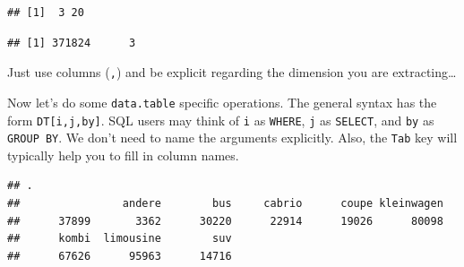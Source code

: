 \documentclass[]{book}
\newenvironment{Shaded}{\begin{snugshade}}{\end{snugshade}}
\newcommand{\CommentTok}[1]{\textcolor[rgb]{0.56,0.35,0.01}{\textit{#1}}}
\newcommand{\DecValTok}[1]{\textcolor[rgb]{0.00,0.00,0.81}{#1}}
\newcommand{\KeywordTok}[1]{\textcolor[rgb]{0.13,0.29,0.53}{\textbf{#1}}}
\newcommand{\NormalTok}[1]{#1}
\newcommand{\OperatorTok}[1]{\textcolor[rgb]{0.81,0.36,0.00}{\textbf{#1}}}
\newcommand{\StringTok}[1]{\textcolor[rgb]{0.31,0.60,0.02}{#1}}
\theoremstyle{definition}
\theoremstyle{definition}
\theoremstyle{definition}
\theoremstyle{remark}
\begin{document}
\begin{Shaded}
\end{Shaded}

\begin{verbatim}
## [1]  3 20
\end{verbatim}

\begin{Shaded}
\end{Shaded}

\begin{verbatim}
## [1] 371824      3
\end{verbatim}

Just use columns (\texttt{,}) and be explicit regarding the dimension you are extracting\ldots{}

Now let's do some \texttt{data.table} specific operations.
The general syntax has the form \texttt{DT{[}i,j,by{]}}.
SQL users may think of \texttt{i} as \texttt{WHERE}, \texttt{j} as \texttt{SELECT}, and \texttt{by} as \texttt{GROUP\ BY}.
We don't need to name the arguments explicitly.
Also, the \texttt{Tab} key will typically help you to fill in column names.

\begin{Shaded}
\end{Shaded}

\begin{verbatim}
## .
##                andere        bus     cabrio      coupe kleinwagen 
##      37899       3362      30220      22914      19026      80098 
##      kombi  limousine        suv 
##      67626      95963      14716
\end{verbatim}

\begin{Shaded}
\end{Shaded}
\end{document}
